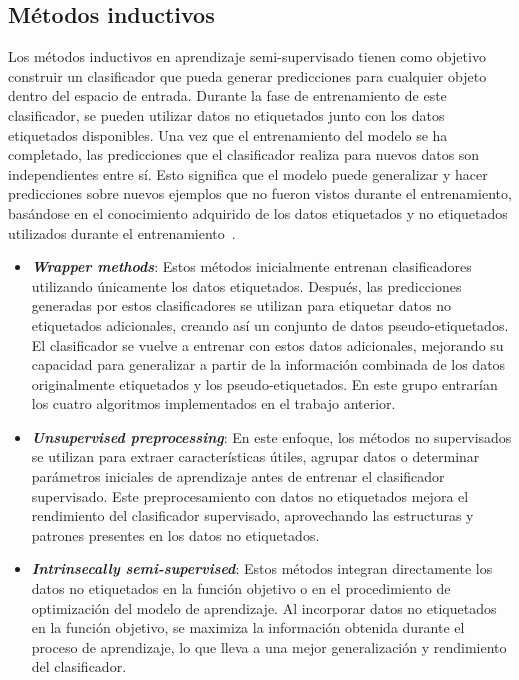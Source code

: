 \subsection{Métodos inductivos}
Los métodos inductivos en aprendizaje semi-supervisado tienen como objetivo construir un clasificador que pueda generar predicciones para cualquier objeto dentro del espacio de entrada. Durante la fase de entrenamiento de este clasificador, se pueden utilizar datos no etiquetados junto con los datos etiquetados disponibles. Una vez que el entrenamiento del modelo se ha completado, las predicciones que el clasificador realiza para nuevos datos son independientes entre sí. Esto significa que el modelo puede generalizar y hacer predicciones sobre nuevos ejemplos que no fueron vistos durante el entrenamiento, basándose en el conocimiento adquirido de los datos etiquetados y no etiquetados utilizados durante el entrenamiento~\cite{Engelen:semi-supervised}.
\begin{itemize}
	\item \textbf{\textit{Wrapper methods}}: Estos métodos inicialmente entrenan clasificadores utilizando únicamente los datos etiquetados. Después, las predicciones generadas por estos clasificadores se utilizan para etiquetar datos no etiquetados adicionales, creando así un conjunto de datos pseudo-etiquetados. El clasificador se vuelve a entrenar con estos datos adicionales, mejorando su capacidad para generalizar a partir de la información combinada de los datos originalmente etiquetados y los pseudo-etiquetados. En este grupo entrarían los cuatro algoritmos implementados en el trabajo anterior.
	\item \textbf{\textit{Unsupervised preprocessing}}: En este enfoque, los métodos no supervisados se utilizan para extraer características útiles, agrupar datos o determinar parámetros iniciales de aprendizaje antes de entrenar el clasificador supervisado. Este preprocesamiento con datos no etiquetados mejora el rendimiento del clasificador supervisado, aprovechando las estructuras y patrones presentes en los datos no etiquetados.
	\item \textbf{\textit{Intrinsecally semi-supervised}}: Estos métodos integran directamente los datos no etiquetados en la función objetivo o en el procedimiento de optimización del modelo de aprendizaje. Al incorporar datos no etiquetados en la función objetivo, se maximiza la información obtenida durante el proceso de aprendizaje, lo que lleva a una mejor generalización y rendimiento del clasificador.
	
\end{itemize}
